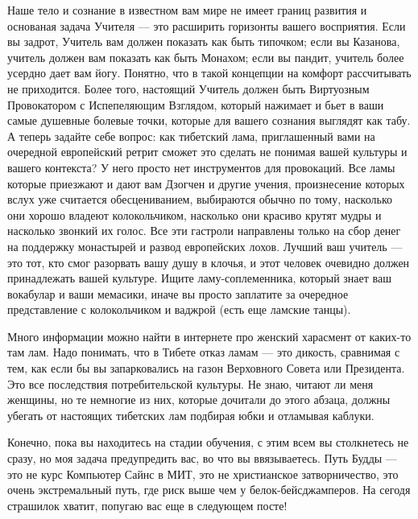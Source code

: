 Наше тело и сознание в известном вам мире не имеет границ развития и основаная задача Учителя — это расширить горизонты вашего восприятия. Если вы задрот, Учитель вам должен показать как быть типочком; если вы Казанова, учитель должен вам показать как быть Монахом; если вы пандит, учитель более усердно дает вам йогу. Понятно, что в такой концепции на комфорт рассчитывать не приходится. Более того, настоящий Учитель должен быть Виртуозным Провокатором с Испепеляющим Взглядом, который нажимает и бьет в ваши самые душевные болевые точки, которые для вашего сознания выглядят как табу. А теперь задайте себе вопрос: как тибетский лама, приглашенный вами на очередной европейский ретрит сможет это сделать не понимая вашей культуры и вашего контекста? У него просто нет инструментов для провокаций. Все ламы которые приезжают и дают вам Дзогчен и другие учения, произнесение которых вслух уже считается обесцениванием, выбираются обычно по тому, насколько они хорошо владеют колокольчиком, насколько они красиво крутят мудры и насколько звонкий их голос. Все эти гастроли направлены только на сбор денег на поддержку монастырей и развод европейских лохов. Лучший ваш учитель — это тот, кто смог разорвать вашу душу в клочья, и этот человек очевидно должен принадлежать вашей культуре. Ищите ламу-соплеменника, который знает ваш вокабулар и ваши мемасики, иначе вы просто заплатите за очередное представление с колокольчиком и ваджрой (есть еще ламские танцы).

Много информации можно найти в интернете про женский харасмент от каких-то там лам. Надо понимать, что в Тибете отказ ламам — это дикость, сравнимая с тем, как если бы вы запарковались на газон Верховного Совета или Президента. Это все последствия потребительской культуры. Не знаю, читают ли меня женщины, но те немногие из них, которые дочитали до этого абзаца, должны убегать от настоящих тибетских лам подбирая юбки и отламывая каблуки.

Конечно, пока вы находитесь на стадии обучения, с этим всем вы столкнетесь не сразу, но моя задача предупредить вас, во что вы ввязываетесь. Путь Будды — это не курс Компьютер Сайнс в МИТ, это не христианское затворничество, это очень экстремальный путь, где риск выше чем у белок-бейсджамперов. На сегодя страшилок хватит, попугаю вас еще в следующем посте!

